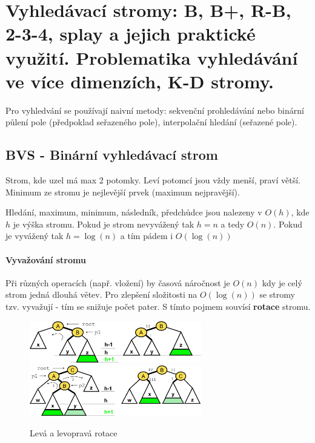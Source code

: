\section[PAL - Stromy]{Vyhledávací stromy: B, B+, R-B, 2-3-4, splay a jejich praktické využití. Problematika vyhledávání ve více dimenzích, K-D stromy.}

Pro vyhledvání se používají naivní metody: sekvenční prohledávání nebo binární půlení pole (předpoklad seřazeného pole), interpolační hledání (seřazené pole).

\subsection{BVS - Binární vyhledávací strom}
Strom, kde uzel má max 2 potomky. Leví potomcí jsou vždy menší, praví větší. Minimum ze stromu je nejlevější prvek (maximum nejpravější).

Hledání, maximum, minimum, následník, předchůdce jsou nalezeny v $O(h)$, kde $h$ je výška stromu. Pokud je strom nevyvážený tak $h=n$ a tedy $O(n)$. Pokud je vyvážený tak $h = \log(n)$ a tím pádem i $O(\log(n))$

\paragraph{Vyvažování stromu} Při různých operacích (např. vložení) by časová náročnost je $O(n)$ kdy je celý strom jedná dlouhá větev. Pro zlepšení složitosti na $O(\log(n))$ se stromy tzv. vyvažují - tím se snižuje počet pater. S tímto pojmem souvísí \textbf{rotace} stromu.

\begin{figure}[h]
    \begin{center}
        \includegraphics[width=75mm]{03/images/rotace-L}
        \includegraphics[width=75mm]{03/images/rotace-LR}
    \end{center}
    \caption{Levá a levopravá rotace}
\end{figure}

